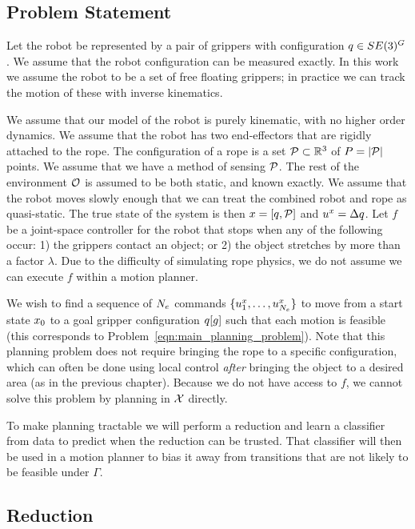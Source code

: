 \subsection{Problem Statement}
Let the robot be represented by a pair of grippers with configuration $q \in SE(3)^G$. We assume that the robot configuration can be measured exactly. In this work we assume the robot to be a set of free floating grippers; in practice we can track the motion of these with inverse kinematics.

We assume that our model of the robot is purely kinematic, with no higher order dynamics. We assume that the robot has two end-effectors that are rigidly attached to the rope. The configuration of a rope is a set $\mathcal{P} \subset \mathbb{R}^3$ of $P = | \mathcal{P} |$ points. We assume that we have a method of sensing $\mathcal{P}$. The rest of the environment $\mathcal{O}$ is assumed to be both static, and known exactly. We assume that the robot moves slowly enough that we can treat the combined robot and rope as quasi-static. The true state of the system is then $x = [q,\mathcal{P}]$ and $u^x = \Delta q$. Let $f$ be a joint-space controller for the robot that stops when any of the following occur: 1) the grippers contact an object; or 2) the object stretches by more than a factor $\lambda$. Due to the difficulty of simulating rope physics, we do not assume we can execute $f$ within a motion planner.

We wish to find a sequence of $N_e$ commands $\{u^x_1, \dots, u^x_{N_e} \}$ to move from a start state $x_0$ to a goal gripper configuration $q[g]$ such that each motion is feasible (this corresponds to Problem~\eqref{eqn:main_planning_problem}). Note that this planning problem does not require bringing the rope to a specific configuration, which can often be done using local control \textit{after} bringing the object to a desired area (as in the previous chapter). Because we do not have access to $f$, we cannot solve this problem by planning in $\mathcal{X}$ directly.

To make planning tractable we will perform a reduction and learn a classifier from data to predict when the reduction can be trusted. That classifier will then be used in a motion planner to bias it away from transitions that are not likely to be feasible under $\Gamma$.

\subsection{Reduction}
\label{sec:isrr_model_approx}

